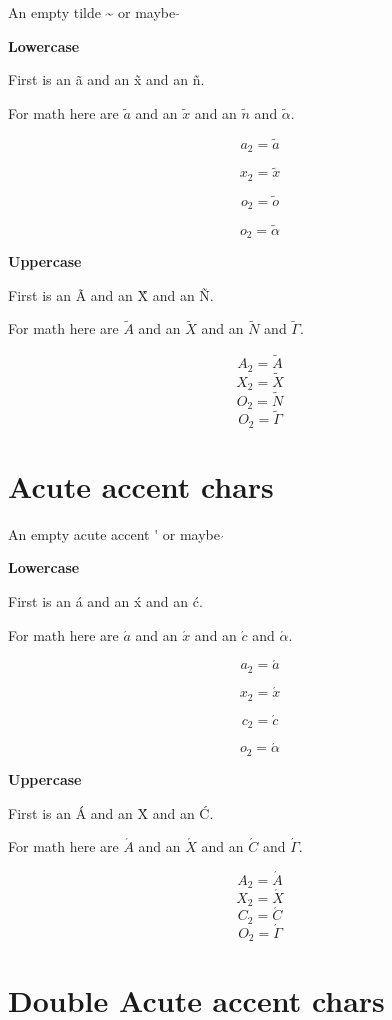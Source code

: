 \documentclass{article}
\begin{document}
An empty tilde \~{} or maybe $\tilde{}$

\textbf{Lowercase}

First is an \~{a} and an \~{x} and an \~{n}.

For math here are $\tilde{a}$ and an $\tilde{x}$ and an $\tilde{n}$ and $\tilde{\alpha}$.

$$a_2=\tilde{a}$$

$$x_2=\tilde{x}$$

$$o_2=\tilde{o}$$

$$o_2=\tilde{\alpha}$$


\textbf{Uppercase}

First is an \~{A} and an \~{X} and an \~{N}.

For math here are $\tilde{A}$ and an $\tilde{X}$ and an $\tilde{N}$ and $\tilde{\Gamma}$.

$$A_2=\tilde{A}$$
$$X_2=\tilde{X}$$
$$O_2=\tilde{N}$$
$$O_2=\tilde{\Gamma}$$




\section{Acute accent chars}

An empty acute accent \'{} or maybe $\acute{}$

\textbf{Lowercase}

First is an \'{a} and an \'{x} and an \'{c}.

For math here are $\acute{a}$ and an $\acute{x}$ and an $\acute{c}$ and $\acute{\alpha}$.

$$a_2=\acute{a}$$

$$x_2=\acute{x}$$

$$c_2=\acute{c}$$

$$o_2=\acute{\alpha}$$

\textbf{Uppercase}

First is an \'{A} and an \'{X} and an \'{C}.

For math here are $\acute{A}$ and an $\acute{X}$ and an $\acute{C}$ and $\acute{\Gamma}$.

$$A_2=\acute{A}$$
$$X_2=\acute{X}$$
$$C_2=\acute{C}$$
$$O_2=\acute{\Gamma}$$




\section{Double Acute accent chars}
\end{document}
